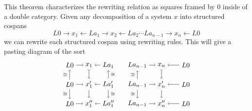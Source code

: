 \documentclass{amsart}
\renewcommand{\gets}{\leftarrow}
\theoremstyle{remark}
\theoremstyle{definition}
\begin{document}
This theorem characterizes the rewriting relation as squares
framed by $ 0 $ inside of a double category. Given any
decomposition of a system $ x $ into structured cospans
%
\[
  L0 \to x_1 \gets La_1 \to x_2 \gets La_2 \dotsm La_{n-1} \to x_n
  \gets L0
\]
%
we can rewrite each structured cospan using rewriting rules. This will give a pasting diagram of the
sort
% 
\[
  \begin{tikzpicture}
    \begin{scope}[shift={(0,3)}]
      \node (1) at (0,2) {$ L0 $};
      \node (2) at (1,2) {$ x_1 $};
      \node (3) at (2,2) {$ La_1 $};
      \node (4) at (0,1) {$ L0 $};
      \node (5) at (1,1) {$ x'_1 $};
      \node (6) at (2,1) {$ La'_1 $};
      \node (7) at (0,0) {$ L0 $};
      \node (8) at (1,0) {$ x''_1 $};
      \node (9) at (2,0) {$ La''_1 $};
      \draw [->] (1) to node [] {\scriptsize{$  $}} (2);
      \draw [->] (3) to node [] {\scriptsize{$  $}} (2);
      \draw [->] (4) to node [] {\scriptsize{$  $}} (5);
      \draw [->] (6) to node [] {\scriptsize{$  $}} (5);
      \draw [->] (7) to node [] {\scriptsize{$  $}} (8);
      \draw [->] (9) to node [] {\scriptsize{$  $}} (8);
      \draw [->] (4) to node [left] {\scriptsize{$ \cong $}} (1);
      \draw [->] (4) to node [left] {\scriptsize{$ \cong $}} (7);
      \draw [>->] (2) to node [] {\scriptsize{$  $}} (5);
      \draw [->] (5) to node [] {\scriptsize{$  $}} (8);
      \draw [->] (6) to node [right] {\scriptsize{$ \cong  $}} (3);
      \draw [->] (6) to node [right] {\scriptsize{$ \cong $}} (9);
    \end{scope}
    \begin{scope}[shift={(3.5,3)}]
      \node (1) at (0,2) {$ La_{n-1} $};
      \node (2) at (1.25,2) {$ x_n $};
      \node (3) at (2.5,2) {$ L0 $};
      \node (4) at (0,1) {$ La_{n-1} $};
      \node (5) at (1.25,1) {$ x'_n $};
      \node (6) at (2.5,1) {$ L0 $};
      \node (7) at (0,0) {$ La_{n-1} $};
      \node (8) at (1.25,0) {$ x''_n $};
      \node (9) at (2.5,0) {$ L0 $};
       \draw [->] (1) to node [] {\scriptsize{$  $}} (2);
      \draw [->] (3) to node [] {\scriptsize{$  $}} (2);
      \draw [->] (4) to node [] {\scriptsize{$  $}} (5);
      \draw [->] (6) to node [] {\scriptsize{$  $}} (5);
      \draw [->] (7) to node [] {\scriptsize{$  $}} (8);
      \draw [->] (9) to node [] {\scriptsize{$  $}} (8);
      \draw [->] (4) to node [left] {\scriptsize{$ \cong $}} (1);
      \draw [->] (4) to node [left] {\scriptsize{$ \cong $}} (7);
      \draw [>->] (2) to node [] {\scriptsize{$  $}} (5);
      \draw [->] (5) to node [] {\scriptsize{$  $}} (8);

\end{scope}
\end{tikzpicture}\]
\end{document}
